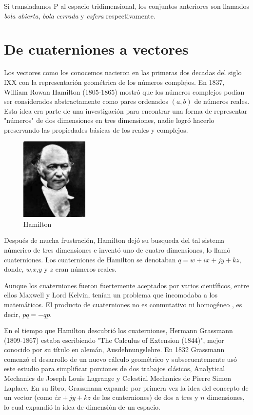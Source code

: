 Si transladamos P al espacio tridimensional, los conjuntos anteriores son llamados \emph{bola abierta},
\emph{bola cerrada} y \emph{esfera} respectivamente.

\section{De cuaterniones a vectores}
Los vectores como los conocemos nacieron en las primeras dos decadas del siglo IXX con la representación
geométrica de los números complejos. En 1837, William Rowan Hamilton (1805-1865) mostró que los números
complejos pod\'ian ser considerados abstractamente como pares ordenados $(a,b)$ de números reales. Esta idea
era parte de una investigación para encontrar una forma de representar "números" de dos dimensiones en tres
dimensiones, nadie logró hacerlo preservando las propiedades básicas de los reales y complejos. \\

\begin{figure}[!ht]
  \begin{center}
    \includegraphics[width=0.3\textwidth]{gfx/hamilton}
  \end{center}
  \caption{Hamilton}
\end{figure}

Después de mucha frustración, Hamilton dejó su busqueda del tal sistema númerico de tres dimensiones e inventó
uno de cuatro dimensiones, lo llamó cuaterniones. Los cuaterniones de Hamilton se denotaban $q = w + ix + jy + kz$, donde, $w$,$x$,$y$ y $z$ eran números reales.

Aunque los cuaterniones fueron fuertemente aceptados por varios científicos, entre ellos Maxwell y Lord Kelvin,
ten\'ian un problema que incomodaba a los matemáticos. El producto de cuaterniones no es conmutativo ni homog\'eneo
, es decir, $pq = -qp$.

En el tiempo que Hamilton descubrió los cuaterniones, Hermann Grassmann (1809-1867) estaba escribiendo
"The Calculus of Extension (1844)", mejor conocido por su título en alemán, Ausdehnungslehre. En 1832
Grassmann comenzó el desarrollo de un nuevo cálculo geométrico y subsecuentemente usó este estudio para
simplificar porciones de dos trabajos clásicos, Analytical Mechanics de Joseph Louis Lagrange y Celestial
Mechanics de Pierre Simon Laplace. En su libro, Grassmann expande por primera vez la idea del concepto
de un vector (como $ix + jy + kz$ de los cuaterniones) de dos a tres y $n$ dimensiones, lo cual expandió
la idea de dimensión de un espacio.

